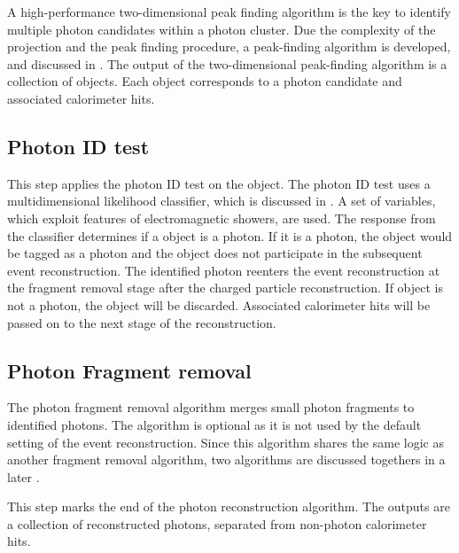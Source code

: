 A high-performance two-dimensional peak finding algorithm is the key to identify multiple photon candidates within a photon cluster. Due the complexity of the projection and the peak finding procedure, a peak-finding algorithm is developed, and discussed in . The output of the two-dimensional peak-finding algorithm is a collection of \ShowerPeak objects. Each \ShowerPeak object corresponds to a photon candidate and associated calorimeter hits.

\subsection{Photon ID test}
\label{sec:photonIDtest}

This step applies the photon ID test on the \ShowerPeak object. The photon ID test uses  a multidimensional likelihood classifier, which is discussed in . A set of variables, which exploit features of electromagnetic showers, are used. The response from the classifier determines if a \ShowerPeak object is a photon. If it is a photon, the \ShowerPeak object would be tagged as a photon and the \ShowerPeak object  does not participate in the subsequent event reconstruction. The identified photon reenters the event reconstruction at the fragment removal stage after the charged particle reconstruction. If \ShowerPeak object  is not a photon, the \ShowerPeak object  will be discarded. Associated calorimeter hits will be passed on to the next stage of the reconstruction.



\subsection{Photon Fragment removal}
\label{sec:photonRecoFragRemoval}

The  photon fragment removal algorithm merges small photon fragments to identified photons. The algorithm is optional as it is not used by the default setting of the event reconstruction. Since this algorithm shares the same logic as another fragment removal algorithm, two algorithms are discussed togethers in a later .


This step marks the end of the photon reconstruction algorithm. The outputs are a collection of reconstructed photons, separated from non-photon calorimeter hits.

